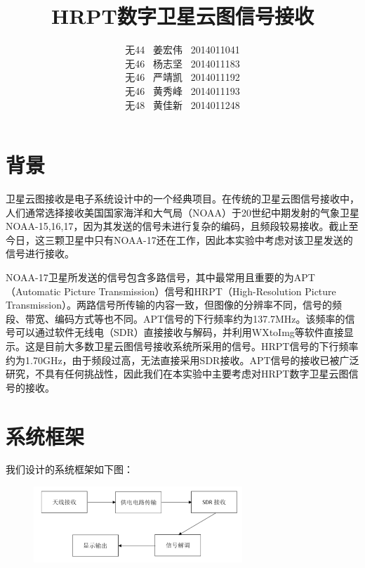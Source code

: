 \documentclass[UTF8]{ctexart}
\begin{document}
\title{\textbf{HRPT数字卫星云图信号接收}}
\author{无44 \ 姜宏伟 \ 2014011041\\
        无46 \ 杨志坚 \ 2014011183\\
        无46 \ 严靖凯 \ 2014011192\\
        无46 \ 黄秀峰 \ 2014011193\\
        无48 \ 黄佳新 \ 2014011248}
\date{}
\maketitle

\section{背景}

卫星云图接收是电子系统设计中的一个经典项目。在传统的卫星云图信号接收中，人们通常选择接收美国国家海洋和大气局（NOAA）于20世纪中期发射的气象卫星NOAA-15,16,17，因为其发送的信号未进行复杂的编码，且频段较易接收。截止至今日，这三颗卫星中只有NOAA-17还在工作，因此本实验中考虑对该卫星发送的信号进行接收。

NOAA-17卫星所发送的信号包含多路信号，其中最常用且重要的为APT（Automatic Picture Transmission）信号和HRPT（High-Resolution Picture Transmission）。两路信号所传输的内容一致，但图像的分辨率不同，信号的频段、带宽、编码方式等也不同。APT信号的下行频率约为137.7MHz。该频率的信号可以通过软件无线电（SDR）直接接收与解码，并利用WXtoImg等软件直接显示。这是目前大多数卫星云图信号接收系统所采用的信号。HRPT信号的下行频率约为1.70GHz，由于频段过高，无法直接采用SDR接收。APT信号的接收已被广泛研究，不具有任何挑战性，因此我们在本实验中主要考虑对HRPT数字卫星云图信号的接收。

\section{系统框架}

我们设计的系统框架如下图：
\begin{figure}[H]
        \centering
        \includegraphics[width=0.7\textwidth]{images//framework.png}
\end{figure}
\end{document}
